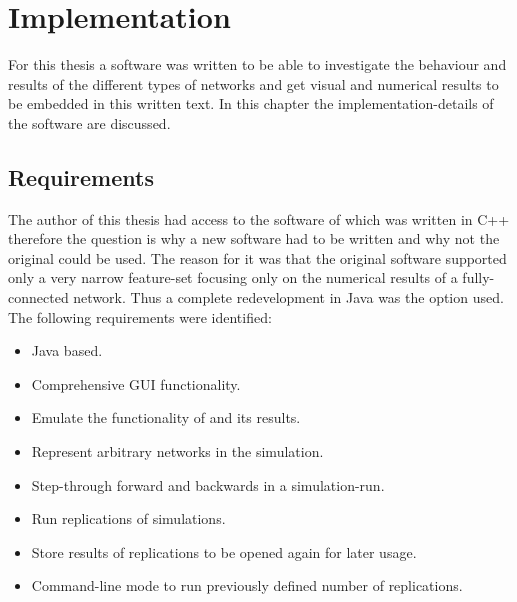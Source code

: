 \documentclass[Bachelorarbeit.tex]{subfiles}
\begin{document}
\graphicspath{{./figures/implementation/}}	%

\chapter{Implementation}
\label{ch:implementation}

For this thesis a software was written to be able to investigate the behaviour and results of the different types of networks and get visual and numerical results to be embedded in this written text. In this chapter the implementation-details of the software are discussed.

\section{Requirements}
The author of this thesis had access to the software of \cite{Breuer2015} which was written in C++ therefore the question is why a new software had to be written and why not the original could be used. The reason for it was that the original software supported only a very narrow feature-set focusing only on the numerical results of a fully-connected network. Thus a complete redevelopment in Java was the option used. The following requirements were identified:

\begin{itemize}
\item Java based.
\item Comprehensive GUI functionality.
\item Emulate the functionality of \cite{Breuer2015} and its results.
\item Represent arbitrary networks in the simulation.
\item Step-through forward and backwards in a simulation-run.
\item Run replications of simulations.
\item Store results of replications to be opened again for later usage.
\item Command-line mode to run previously defined number of replications.
\end{itemize}
\end{document}
